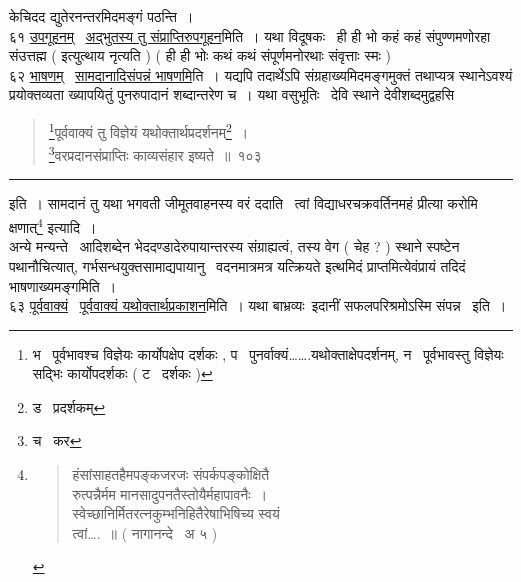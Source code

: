 \documentclass[11pt, openany]{book}
\begin{document}
केचिदद द्युतेरनन्तरमिदमङ्गं पठन्ति~।\\

६१ \underline{उपगूहनम्} \textendash\ \underline{अद्भुतस्य तु संप्राप्तिरुपगूहन}मिति~। यथा विदूषकः \textendash\ ही ही भो कहं कहं संपुण्णमणोरहा संउत्तह्म ( इत्युत्थाय नृत्यति ) ( ही ही भोः कथं कथं संपूर्णमनोरथाः संवृत्ताः स्मः )\\

६२ \underline{भाषणम्} \textendash\ \underline{सामदानादिसंपन्नं भाषणमि}ति~। यद्यपि तदार्थेऽपि संग्रहाख्यमिदमङ्गमुक्तं तथाप्यत्र स्थानेऽवश्यं प्रयोक्तव्यता ख्यापयितुं पुनरुपादानं शब्दान्तरेण च~। यथा वसुभूतिः \textendash\ देवि स्थाने देवीशब्दमुद्वहसि \textendash

\newpage

\begin{quote}
{\na \renewcommand{\thefootnote}{1}\footnote{भ \textendash\ पूर्वभावश्च विज्ञेयः कार्योपक्षेप दर्शकः , प \textendash\ पुनर्वाक्यं\ldots\ldots.यथोक्ताक्षेपदर्शनम्, न \textendash\ पूर्वभावस्तु विज्ञेयः सद्भिः कार्योपदर्शकः ( ट \textendash\ दर्शकः )}पूर्ववाक्यं तु विज्ञेयं यथोक्तार्थप्रदर्शनम्\renewcommand{\thefootnote}{2}\footnote{ड \textendash\ प्रदर्शकम्}~।\\
\renewcommand{\thefootnote}{3}\footnote{च \textendash\ कर}वरप्रदानसंप्राप्तिः काव्यसंहार इष्यते~॥~१०३}
\end{quote}

\hrule

\vspace{2mm}
\noindent
इति~। सामदानं तु यथा भगवती जीमूतवाहनस्य वरं ददाति \textendash\ {\qt त्वां विद्याधरचक्रवर्तिनमहं प्रीत्या करोमि क्षणात्\renewcommand{\thefootnote}{*}\footnote{\begin{quote}
{\qt हंसांसाहतहैमपङ्कजरजः संपर्कपङ्कोक्षितै\textendash \\
रुत्पन्नैर्मम मानसादुपनतैस्तोयैर्महापावनैः~।\\
स्वेच्छानिर्मितरत्नकुम्भनिहितैरेषाभिषिच्य स्वयं\\
त्वां\ldots.~॥ ( नागानन्दे \textendash\ अ ५ )}
\end{quote}}} इत्यादि~।\\

अन्ये मन्यन्ते \textendash\ आदिशब्देन भेददण्डादेरुपायान्तरस्य संग्राह्यत्वं, तस्य वेग ( चेह ? ) स्थाने स्पष्टेन पथानौचित्यात्, गर्भसन्धयुक्तसामाद्यपायानु \textendash\ वदनमात्रमत्र यत्क्रियते इत्थमिदं प्राप्तमित्येवंप्रायं तदिदं भाषणाख्यमङ्गमिति~।\\

६३ \underline{पूर्ववाक्यं} \textendash\ \underline{पूर्ववाक्यं यथोक्तार्थप्रकाशन}मिति~। यथा बाभ्रव्यः\textendash\ इदानीं सफलपरिश्रमोऽस्मि संपन्न \textendash\ इति~।\\
\end{document}
